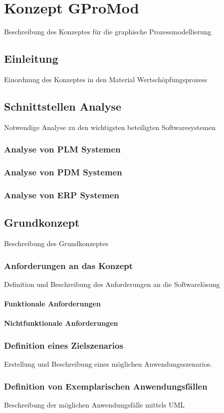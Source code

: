 \chapter{Konzept GProMod}
Beschreibung des Konzeptes für die graphische Prozessmodellierung
\section{Einleitung}
Einordnung des Konzeptes in den Material Wertschöpfungsprozess

\section{Schnittstellen Analyse}
Notwendige Analyse zu den wichtigsten beteiligten Softwaresystemen
\subsection{Analyse von PLM Systemen}
\subsection{Analyse von PDM Systemen}
\subsection{Analyse von ERP Systemen}

\section{Grundkonzept}
Beschreibung des Grundkonzeptes
\subsection{Anforderungen an das Konzept}
Definition und Beschreibung des Anforderungen an die Softwarelösung
\subsubsection{Funktionale Anforderungen}
\subsubsection{Nichtfunktionale Anforderungen}
\subsection{Definition eines Zielszenarios}
Erstellung und Beschreibung eines möglichen Anwendungsszenarios.
\subsection{Definition von Exemplarischen Anwendungsfällen}
Beschreibung der möglichen Anwendungsfälle mittels UML
